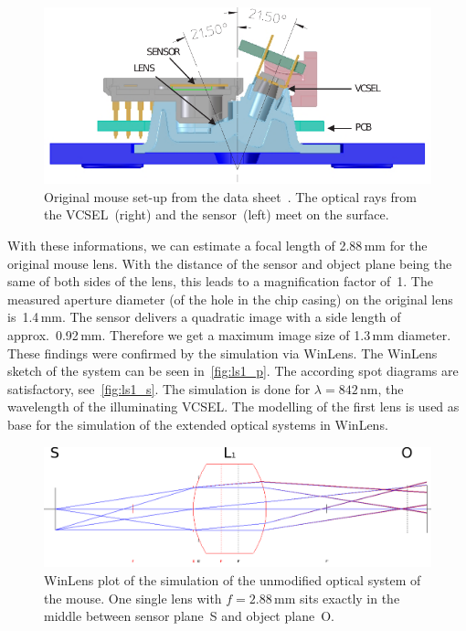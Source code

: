 \documentclass[12pt,a4paper]{article}
\begin{document}
\begin{figure}[htbp]
\begin{center}
\includegraphics[width=1\columnwidth]{figures/o_setup_datasheet}
\caption{\label{fig:o_setup_datasheet}
Original mouse set-up from the data sheet~\cite{adns}.
The optical rays from the VCSEL~(right) and the sensor~(left) meet on the surface.
}
\end{center}
\end{figure}

With these informations, we can estimate a focal length of 2.88\,mm for the original mouse lens.
With the distance of the sensor and object plane being the same of both sides of the lens, this leads to a magnification factor of~1.
The measured aperture diameter (of the hole in the chip casing) on the original lens is~1.4\,mm.
The sensor delivers a quadratic image with a side length of approx.~0.92\,mm. 
Therefore we get a maximum image size of 1.3\,mm diameter.\\
These findings were confirmed by the simulation via WinLens.
The WinLens sketch of the system can be seen in~\autoref{fig:ls1_p}.
The according spot diagrams are satisfactory, see~\autoref{fig:ls1_s}.
The simulation is done for $\lambda = 842$\,nm, the wavelength of the illuminating VCSEL. 
The modelling of the first lens is used as base for the simulation of the extended optical systems in WinLens.

\begin{figure}[htbp]
\begin{center}
\includegraphics[width=1\columnwidth]{figures/lens_system_mouse.pdf}
\caption{\label{fig:ls1_p}
WinLens plot of the simulation of the unmodified optical system of the mouse.
One single lens with $f=2.88$\,mm sits exactly in the middle between sensor plane~S and object plane~O.
}
\end{center}
\end{figure}
\end{document}
